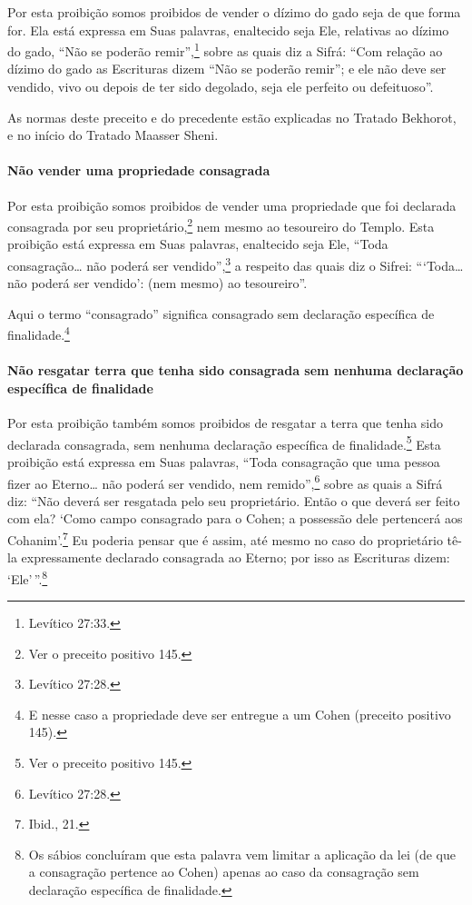 Por esta proibição somos proibidos de vender o dízimo do gado seja de
que forma for. Ela está expressa em Suas palavras, enaltecido seja Ele,
relativas ao dízimo do gado, ``Não se poderão remir'',\footnote{Levítico 27:33.}
sobre as quais diz a Sifrá: ``Com relação ao dízimo do gado as
Escrituras dizem ``Não se poderão remir''; e ele não deve ser vendido,
vivo ou depois de ter sido degolado, seja ele perfeito ou defeituoso''.

As normas deste preceito e do precedente estão explicadas no Tratado
Bekhorot, e no início do Tratado Maasser Sheni.

\paragraph{Não vender uma propriedade consagrada}

Por esta proibição somos proibidos de vender uma propriedade que foi
declarada consagrada por seu proprietário,\footnote{Ver o preceito positivo 145.} nem
mesmo ao tesoureiro do Templo. Esta proibição está expressa em Suas
palavras, enaltecido seja Ele,
``Toda consagração\ldots{} não poderá ser vendido'',\footnote{Levítico 27:28.} a
respeito das quais diz o Sifrei: ```Toda\ldots{} não poderá ser vendido':
(nem mesmo) ao tesoureiro''.

Aqui o termo ``consagrado'' significa consagrado sem declaração
específica de finalidade.\footnote{E nesse caso a propriedade deve ser entregue a um Cohen (preceito positivo 145).}

\paragraph{Não resgatar terra que tenha sido consagrada sem nenhuma declaração
específica de finalidade}

Por esta proibição também somos proibidos de resgatar a terra que tenha
sido declarada consagrada, sem nenhuma declaração específica de
finalidade.\footnote{Ver o preceito positivo 145.} Esta proibição está expressa em Suas
palavras, ``Toda consagração que uma pessoa fizer ao Eterno\ldots{} não
poderá ser vendido, nem remido'',\footnote{Levítico 27:28.} sobre as quais a
Sifrá diz: ``Não deverá ser resgatada pelo seu proprietário. Então o que
deverá ser feito com ela? `Como campo consagrado para o Cohen; a
possessão dele pertencerá aos Cohanim'.\footnote{Ibid., 21.} Eu poderia pensar
que é assim, até mesmo no caso do proprietário tê-la expressamente
declarado consagrada ao Eterno; por isso as Escrituras dizem:
`Ele'\,''.\footnote{Os sábios concluíram que esta palavra vem limitar a aplicação da
lei (de que a consagração pertence ao Cohen) apenas ao caso da
consagração sem declaração específica de finalidade.}

